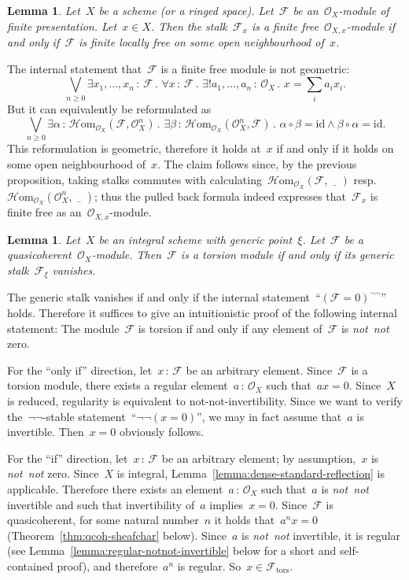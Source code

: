 \documentclass[10pt,reqno,a4paper]{amsbook}
\makeatletter
\theoremstyle{definition}
\theoremstyle{plain}
\newtheorem{lemma}[defn]{Lemma}
\theoremstyle{remark}
\newcommand{\F}{\mathcal{F}}
\renewcommand{\O}{\mathcal{O}}
\newcommand{\HOM}{\mathcal{H}\mathrm{om}}
\newcommand{\id}{\mathrm{id}}
\newcommand{\placeholder}{\underline{\quad}}
\newcommand{\tors}{\mathrm{tors}}
\newcommand{\?}{\,{:}\,}
\renewcommand{\_}{\mathpunct{.}\,}
\newcommand{\resp}{resp.\@\xspace}
\newcommand{\notnot}{\emph{not~not}\xspace}
\renewenvironment{proof}[1][\proofname]{\par
  \pushQED{\qed}%
  \normalfont \topsep6\p@\@plus6\p@\relax
  \trivlist
  \item[\hskip\labelsep
        \itshape
    #1\@addpunct{.}]\ignorespaces
}{%
  \popQED\endtrivlist\@endpefalse
}
\makeatother
\begin{document}
\begin{lemma}Let~$X$ be a scheme (or a ringed space). Let~$\F$ be an~$\O_X$-module of finite
presentation. Let~$x \in X$. Then the stalk~$\F_x$ is a finite
free~$\O_{X,x}$-module if and only if~$\F$ is finite locally free on some open
neighbourhood of~$x$.\end{lemma}
\begin{proof}The internal statement that~$\F$ is a finite free module is not geometric:
\[ \bigvee_{n \geq 0}
  \exists x_1,\ldots,x_n\?\F\_
  \forall x\?\F\_
  \exists! a_1,\ldots,a_n\?\O_X\_
  x = \textstyle\sum_i a_i x_i. \]
But it can equivalently be reformulated as
\[ \bigvee_{n \geq 0}
  \exists \alpha\?\HOM_{\O_X}(\F,\O_X^n)\_
  \exists \beta\?\HOM_{\O_X}(\O_X^n,\F)\_
  \alpha \circ \beta = \id \wedge \beta \circ \alpha = \id. \]
This reformulation is geometric, therefore it holds at~$x$ if and only if it
holds on some open neighbourhood of~$x$. The claim follows since, by the
previous proposition, taking stalks commutes with
calculating~$\HOM_{\O_X}(\F,\placeholder)$ \resp~$\HOM_{\O_X}(\O_X^n,\placeholder)$;
thus the pulled back formula indeed expresses that~$\F_x$ is finite free as
an~$\O_{X,x}$-module.
\end{proof}

\begin{lemma}\label{lemma:torsion-module-generic-stalk}
Let~$X$ be an integral scheme with generic point~$\xi$. Let~$\F$
be a quasicoherent~$\O_X$-module. Then~$\F$ is a torsion module if and only if
its generic stalk~$\F_\xi$ vanishes.
\end{lemma}
\begin{proof}The generic stalk vanishes if and only if the internal
statement~``$(\F = 0)^{\neg\neg}$'' holds. Therefore it suffices to give an
intuitionistic proof of the following internal statement: The module~$\F$ is
torsion if and only if any element of~$\F$ is \notnot zero.

For the ``only if'' direction, let~$x\?\F$ be an arbitrary element. Since~$\F$
is a torsion module, there exists a regular element~$a\?\O_X$ such that~$ax =
0$. Since~$X$ is reduced, regularity is equivalent to not-not-invertibility.
Since we want to verify the~$\neg\neg$-stable statement~``$\neg\neg(x = 0)$'', we
may in fact assume that~$a$ is invertible. Then~$x = 0$ obviously follows.

For the ``if'' direction, let~$x\?\F$ be an arbitrary element; by assumption,~$x$
is \notnot zero. Since~$X$ is integral,
Lemma~\ref{lemma:dense-standard-reflection} is applicable. Therefore there
exists an element~$a\?\O_X$ such that~$a$ is \notnot invertible and such that
invertibility of~$a$ implies~$x = 0$. Since~$\F$ is quasicoherent, for some
natural number~$n$ it holds that~$a^n x = 0$ (Theorem~\ref{thm:qcoh-sheafchar}
below). Since~$a$ is \notnot invertible,
it is regular (see Lemma~\ref{lemma:regular-notnot-invertible} below for a short
and self-contained proof), and therefore~$a^n$ is regular. So~$x \in \F_\tors$.
\end{proof}
\end{document}
